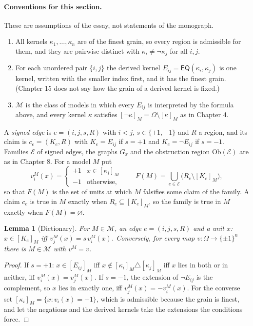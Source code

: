 \documentclass[11pt]{article}
\theoremstyle{plain}
\newtheorem{lemma}[theorem]{Lemma}
\theoremstyle{definition}
\theoremstyle{remark}
\newcommand{\Om}{\Omega}
\newcommand{\Ob}{\mathrm{Ob}}
\newcommand{\EQ}{\mathsf{EQ}}
\newcommand{\nk}[1]{\neg#1}
\newcommand{\ext}[2]{[#1]_{#2}}
\begin{document}
\paragraph{Conventions for this section.} These are assumptions of the essay, not statements of the monograph.
\begin{enumerate}[label=(C\arabic*),nosep]
\item All kernels $\kappa_1,\dots,\kappa_n$ are of the finest grain, so every region is admissible for them, and they are pairwise distinct with $\kappa_i\ne\nk{\kappa_j}$ for all $i,j$.
\item For each unordered pair $\{i,j\}$ the derived kernel $E_{ij}=\EQ(\kappa_i,\kappa_j)$ is one kernel, written with the smaller index first, and it has the finest grain. (Chapter 15 does not say how the grain of a derived kernel is fixed.)
\item $\mathcal M$ is the class of models in which every $E_{ij}$ is interpreted by the formula above, and every kernel $\kappa$ satisfies $\ext{\nk{\kappa}}{M}=\Om\setminus\ext{\kappa}{M}$ as in Chapter 4.
\end{enumerate}
A \emph{signed edge} is $e=(i,j,s,R)$ with $i<j$, $s\in\{+1,-1\}$ and $R$ a region, and its claim is $c_e=(K_e,R)$ with $K_e=E_{ij}$ if $s=+1$ and $K_e=\nk{E_{ij}}$ if $s=-1$. Families $\mathcal E$ of signed edges, the graphs $G_x$ and the obstruction region $\Ob(\mathcal E)$ are as in Chapter 8. For a model $M$ put
\[
v^M_i(x)=\begin{cases}+1&x\in\ext{\kappa_i}{M}\\-1&\text{otherwise,}\end{cases}
\qquad
F(M)=\bigcup_{e\in\mathcal E}\bigl(R_e\setminus\ext{K_e}{M}\bigr),
\]
so that $F(M)$ is the set of units at which $M$ falsifies some claim of the family. A claim $c_e$ is true in $M$ exactly when $R_e\subseteq\ext{K_e}{M}$, so the family is true in $M$ exactly when $F(M)=\varnothing$.

\begin{lemma}[Dictionary]\label{lem:dict}
For $M\in\mathcal M$, an edge $e=(i,j,s,R)$ and a unit $x$: $x\in\ext{K_e}{M}$ iff $v^M_j(x)=s\,v^M_i(x)$. Conversely, for every map $v:\Om\to\{\pm1\}^n$ there is $M\in\mathcal M$ with $v^M=v$.
\end{lemma}

\begin{proof}
If $s=+1$: $x\in\ext{E_{ij}}{M}$ iff $x\notin\ext{\kappa_i}{M}\triangle\ext{\kappa_j}{M}$ iff $x$ lies in both or in neither, iff $v_i^M(x)=v_j^M(x)$. If $s=-1$, the extension of $\nk{E_{ij}}$ is the complement, so $x$ lies in exactly one, iff $v^M_j(x)=-v^M_i(x)$. For the converse set $\ext{\kappa_i}{M}=\{x:v_i(x)=+1\}$, which is admissible because the grain is finest, and let the negations and the derived kernels take the extensions the conditions force.
\end{proof}
\end{document}
